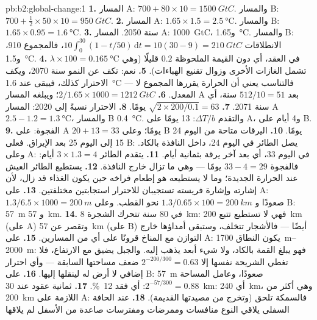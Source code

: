 \begin{solution}{pb:b2:global-change:1}
\textbf{1.} المسار A: $700 + 80\times 10 = \qty{1500}{GtC}$. والمسار B: $700 +
\tfrac12\times 50\times 10 = \qty{950}{GtC}$.
\textbf{2.} المسار A: $1.65\times 1.5 = \qty{2.5}{\celsius}$. والمسار B:
$1.65\times 0.95 = \qty{1.6}{\celsius}$.
\textbf{3.} سنة 2050. المسار A: \qty{1000}{GtC}، و\qty{1.65}{\celsius}. والمسار B:
الانطلاقات $10\int_0^{30}(1 - t/50)\,\mathrm{d}t = 10(30 - 9) =
\qty{210}{GtC}$، فالمجموع 910، و\qty{1.5}{\celsius}.
\textbf{4.} $\lambda\times 100 = \qty{0.165}{\celsius}$ في العقد،
أي دون القيمة الملحوظة $0.2$ قليلًا (وهي تشمل الغازات الأخرى
وزوال تقنيع الهباءات).
\textbf{5.} نعم:  تكف عن النمو سنة 2070، ويكف
الاحترار كذلك، فيبقى عند \qty{1.6}{\celsius} ---
فالتناسب يعني أن الحرارة يقررها المجموع لا
المعدل.
\textbf{6.} $2/1.65\times 1000 = \qty{1212}{GtC}$؛ ويبلغه المسار A
بعد $512/10 = 51$ سنة، أي سنة 2071.
\textbf{7.} $\sqrt{2\times 200/0.1} = 63$ يومًا.
\textbf{8.} الاحترار نسبةً إلى 2020: المسار A $2.5 - 1.2 =
\qty{1.3}{\celsius}$، والمسار B \qty{0.4}{\celsius}. والتقدم $\Delta T/b$:
13 يومًا على A، و4 أيام على B.
\textbf{9.} الفجوة: على A $20 + 13 = 33$ يومًا؛ وعلى B 24 يومًا.
\textbf{10.} اليرقات متاحة من اليوم 15 إلى اليوم 25 بعد
الإيراق. فعلى B: يصل الطائر في اليوم 24، داخل النافذة بالكاد.
وعلى A: في اليوم 33، أي بعد آخر يرقة بثمانية أيام.
\textbf{11.} يتقدم الطائر $3\times 1.3 = 4$ أيام: فالفجوة $33 - 4 =
29$ يومًا --- وهي ما تزال خارج النافذة.
\textbf{12.} يستطيع الطائر العيش عند الحرارة الجديدة؛ وما لا
يستطيعه هو إطعام فراخه حين يكون الغذاء قد زال، لأن إشارته
وإشارة فريسته تستجيبان للاحترار استجابتين مختلفتين.
\textbf{13.} على A: $1.3/6.5\times 1000 = \qty{200}{m}$ صعودًا و
$1.3/0.65\times 100 = \qty{200}{km}$ نحو القطب. وعلى B: \qty{57}{m} و
\qty{57}{km}.
\textbf{14.} في 80 سنة تتحرك الشجرة \qty{8}{km}: فهي لا تستطيع
تتبع \qty{200}{km} (على A) وتقصر عن \qty{57}{km} (على B) أيضًا ---
فالأشجار تتخلف، وستبقى أمداؤها خارج التوازن مع المناخ
قرونًا على أي من المسارين.
\textbf{15.} على A: يكون النطاق \qtyrange{1700}{2000}{m}: فهو يبلغ
القمة بالكاد، ولا شيء أبعد يذهب إليه. والجبل يضيق
مع الارتفاع، فلا تغطي الشريحة نفسها إلا $2^{-200/300} = 0.63$ ضعف
مساحتها السابقة --- وأي احترار إضافي لا أرض له لينقلها
إليها.
\textbf{16.} على B: \qty{57}{m} صعودًا، وعامل المساحة $2^{-57/300} = 0.88$: أي
فقد \qty{12}{\%}.
\textbf{17.} ثمانية عقود عند \qty{30}{km}: أي \qty{240}{km}، وهي أكثر من
\qty{200}{km} اللازمة على A: فالسمكة تلحق (وتخرج
من مصيدتها القديمة).
\textbf{18.} عند الحافة السفلى يلاقي النوع منافسات
وممرضات ومفترسات صاعدة من الأسفل لم يلاقها

\end{solution}
